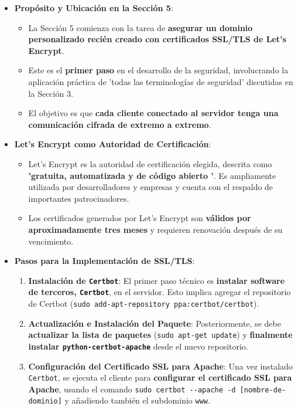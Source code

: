 \documentclass{report}
\begin{document}
\begin{itemize}
    \item \textbf{Propósito y Ubicación en la Sección 5}:
    \begin{itemize}
        \item La Sección 5 comienza con la tarea de \textbf{asegurar un dominio personalizado recién creado con certificados SSL/TLS de Let's Encrypt}.
        \item Este es el \textbf{primer paso} en el desarrollo de la seguridad, involucrando la aplicación práctica de  'todas las terminologías de 
        seguridad' discutidas en la Sección 3.
        \item El objetivo es que \textbf{cada cliente conectado al servidor tenga una comunicación cifrada de extremo a extremo}.
    \end{itemize}
    \item \textbf{Let's Encrypt como Autoridad de Certificación}:
    \begin{itemize}
        \item Let's Encrypt es la autoridad de certificación elegida, descrita como \textbf{ 'gratuita, automatizada y de código abierto '}. Es 
        ampliamente utilizada por desarrolladores y empresas y cuenta con el respaldo de importantes patrocinadores.
        \item Los certificados generados por Let's Encrypt son \textbf{válidos por aproximadamente tres meses} y requieren renovación después de su vencimiento.
    \end{itemize}
    \item \textbf{Pasos para la Implementación de SSL/TLS}:
    \begin{enumerate}
    \item \textbf{Instalación de \texttt{Certbot}}: El primer paso técnico es \textbf{instalar software de terceros, \texttt{Certbot}}, en el servidor. 
    Esto implica agregar el repositorio de Certbot (\verb|sudo add-apt-repository ppa:certbot/certbot|).
    \item \textbf{Actualización e Instalación del Paquete}: Posteriormente, se debe \textbf{actualizar la lista de paquetes} (\verb|sudo apt-get update|) 
    y \textbf{finalmente instalar \texttt{python-certbot-apache}} desde el nuevo repositorio.
    \item \textbf{Configuración del Certificado SSL para Apache}: Una vez instalado \texttt{Certbot}, se ejecuta el cliente para \textbf{configurar el 
    certificado SSL para Apache}, usando el comando \verb|sudo certbot --apache -d [nombre-de-dominio]| y añadiendo también el subdominio \texttt{www}. 

\end{enumerate}
\end{itemize}
\end{document}
